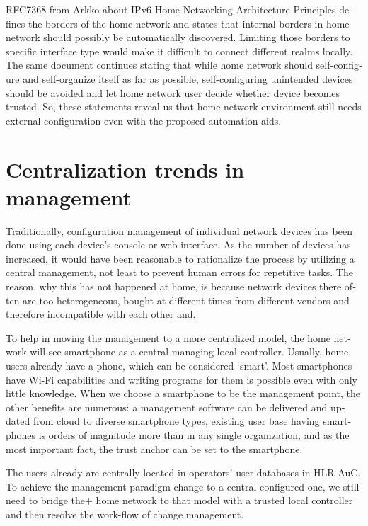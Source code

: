 \documentclass[12pt,a4paper,english]{tutthesis}
\begin{document}
\begin{otherlanguage}{english}
RFC7368\cite{rfc7368} from Arkko about IPv6 Home Networking Architecture Principles 
defines the borders of the home network and states that
internal borders in home network should possibly be automatically
discovered. Limiting those borders to specific
interface type would make it difficult to connect different realms locally.
The same document continues stating
that while home network should self-configure and self-organize itself as
far as possible, self-configuring unintended devices should be
avoided and let home network user decide whether device becomes trusted.
So, these statements reveal us that home network environment still needs
external configuration even with the proposed automation aids.

\section{Centralization trends in management}
\label{sec-3-2}

Traditionally, configuration management of individual network devices has been done
using each device's console or web interface.  As the number of
devices has increased, it would have been reasonable to rationalize
the process by utilizing a central management, not least to prevent human
errors for repetitive tasks.  The reason, why this has not happened at
home, is because network devices there often are too heterogeneous, bought at different times from different vendors
and therefore incompatible with each other and.

To help in moving the management to a more centralized
model, the home network will see smartphone as a central managing local
controller.
Usually, home users already have a phone, which can be considered 
`smart'. Most smartphones have Wi-Fi capabilities and writing programs
for them is possible even with only little knowledge.
When we choose a smartphone to be the management point, the other benefits are
numerous:  a management software can be delivered and
updated from cloud to diverse smartphone types, existing user
base having smartphones is orders of magnitude more than in any single
organization, and as the most important fact, the trust anchor can be set to the smartphone.

The users already are  centrally located  in operators' user databases
in HLR-AuC.  To achieve the management paradigm change to a central configured one,
we still need to bridge the+ home network to that model with a trusted local controller
and then resolve the work-flow of change management.



\end{otherlanguage}
\end{document}
